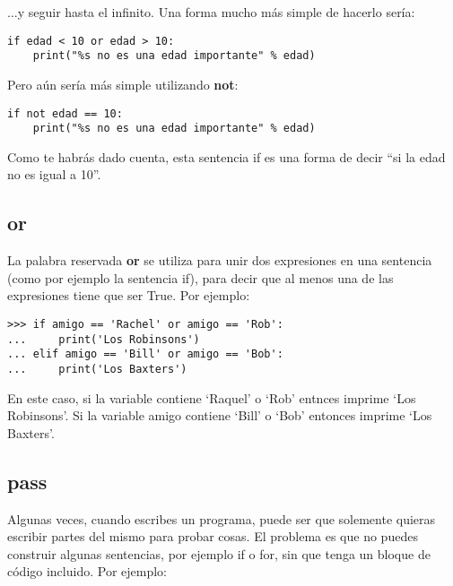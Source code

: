 \noindent
$\ldots$y seguir hasta el infinito. Una forma mucho más simple de hacerlo sería:

\begin{listing}
\begin{verbatim}
if edad < 10 or edad > 10:
    print("%s no es una edad importante" % edad)
\end{verbatim}
\end{listing}

\noindent
Pero aún sería más simple utilizando \textbf{not}:

\begin{listing}
\begin{verbatim}
if not edad == 10:
    print("%s no es una edad importante" % edad)
\end{verbatim}
\end{listing}

\noindent
Como te habrás dado cuenta, esta sentencia if es una forma de decir ``si la edad no es igual a 10''.

\subsection*{or}

La palabra reservada \textbf{or} se utiliza para unir dos expresiones en una sentencia (como por ejemplo la sentencia if), para decir que al menos una de las expresiones tiene que ser True. Por ejemplo:

\begin{listingignore}
\begin{verbatim}
>>> if amigo == 'Rachel' or amigo == 'Rob':
...     print('Los Robinsons')
... elif amigo == 'Bill' or amigo == 'Bob':
...     print('Los Baxters')
\end{verbatim}
\end{listingignore}

En este caso, si la variable  contiene `Raquel' o `Rob' entnces imprime `Los Robinsons'.  Si la variable amigo contiene `Bill' o `Bob' entonces imprime `Los Baxters'.

\subsection*{pass}

Algunas veces, cuando escribes un programa, puede ser que solemente quieras escribir partes del mismo para probar cosas.  El problema es que no puedes construir algunas sentencias, por ejemplo if o for, sin que tenga un bloque de código incluido. Por ejemplo:

